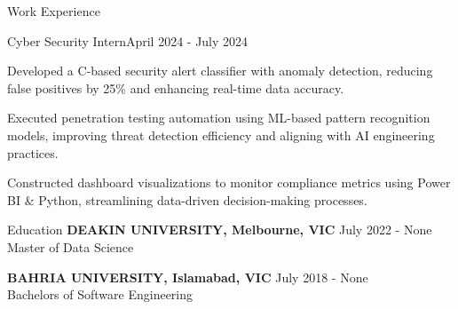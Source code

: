 \documentclass{resume} %
\begin{document}
    \begin{rSection}{Work Experience}
                    \begin{rSubsection}
                {Cyber Security Intern}{April 2024 - July 2024}
                                    {}
                                {}
                                    \item Developed a C{-}based security alert classifier with anomaly detection, reducing false positives by 25\% and enhancing real{-}time data accuracy.
                                    \item Executed penetration testing automation using ML{-}based pattern recognition models, improving threat detection efficiency and aligning with AI engineering practices.
                                    \item Constructed dashboard visualizations to monitor compliance metrics using Power BI \& Python, streamlining data{-}driven decision{-}making processes.
                            \end{rSubsection}
            \end{rSection}

\begin{rSection}{Education}
                        \textbf{DEAKIN UNIVERSITY, Melbourne, VIC} \hfill {July 2022 - None} \\
                            {Master of Data Science}
                         
             
         
                        \textbf{BAHRIA UNIVERSITY, Islamabad, VIC} \hfill {July 2018 - None} \\
                            {Bachelors of Software Engineering}
                         
             
         
    \end{rSection}
\end{document}
